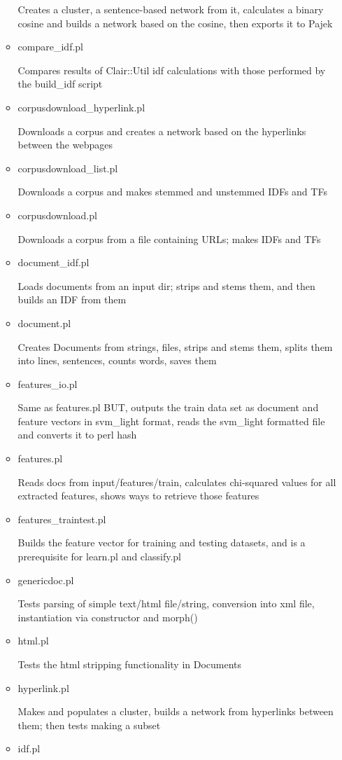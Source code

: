 \begin{itemize}
\begin{itemize}
 Creates a cluster, a sentence-based network from it,
 calculates a binary cosine and builds a network based
 on the cosine, then exports it to Pajek 
  \item compare\_idf.pl

 Compares results of Clair::Util idf calculations with
 those performed by the build\_idf script 
  \item corpusdownload\_hyperlink.pl

 Downloads a corpus and creates a network based on the
 hyperlinks between the webpages
  \item corpusdownload\_list.pl

 Downloads a corpus and makes stemmed and unstemmed IDFs
  and TFs
  \item corpusdownload.pl

 Downloads a corpus from a file containing URLs;
  makes IDFs and TFs
  \item document\_idf.pl

 Loads documents from an input dir; strips and stems them,
 and then builds an IDF from them 
  \item document.pl

 Creates Documents from strings, files, strips and stems them,
 splits them into lines, sentences, counts words, saves them 
  \item features\_io.pl

 Same as features.pl BUT, outputs the train data set as
 document and feature vectors in svm\_light format, reads
 the svm\_light formatted file and converts it to perl hash
  \item features.pl

 Reads docs from input/features/train, calculates chi-squared
 values for all extracted features, shows ways to retrieve
 those features
  \item features\_traintest.pl

 Builds the feature vector for training and testing datasets,
 and is a prerequisite for learn.pl and classify.pl
  \item genericdoc.pl

 Tests parsing of simple text/html file/string, conversion
 into xml file, instantiation via constructor and morph()
  \item html.pl

 Tests the html stripping functionality in Documents 
  \item hyperlink.pl

 Makes and populates a cluster, builds a network from
  hyperlinks between them; then tests making a subset
  \item idf.pl


\end{itemize}
\end{itemize}
